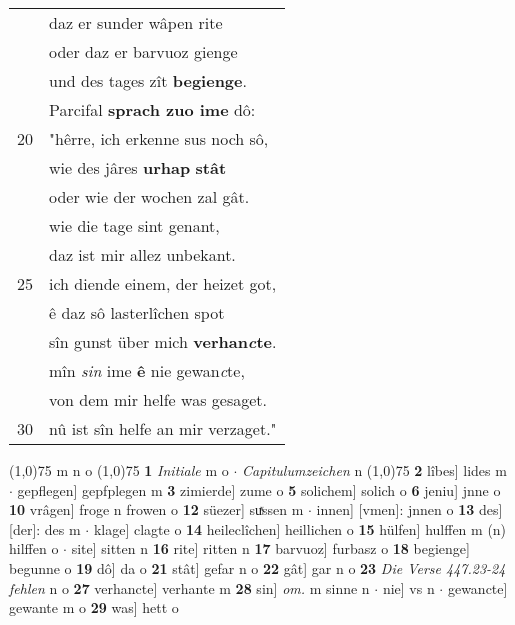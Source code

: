 \documentclass[8pt,a4paper,notitlepage]{article}
\begin{document}
\begin{table}[ht]
\begin{minipage}[t]{0.5\linewidth}
\begin{tabular}{rl}
 & daz er sunder wâpen rite\\ 
 & oder daz er barvuoz gienge\\ 
 & und des tages zît \textbf{begienge}.\\ 
 & Parcifal \textbf{sprach zuo ime} dô:\\ 
20 & "hêrre, ich erkenne sus noch sô,\\ 
 & wie des jâres \textbf{urhap} \textbf{stât}\\ 
 & oder wie der wochen zal gât.\\ 
 & wie die tage sint genant,\\ 
 & daz ist mir allez unbekant.\\ 
25 & ich diende einem, der heizet got,\\ 
 & ê daz sô lasterlîchen spot\\ 
 & sîn gunst über mich \textbf{verhan\textit{c}te}.\\ 
 & mîn \textit{sin} ime \textbf{ê} nie gewan\textit{c}te,\\ 
 & von dem mir helfe was gesaget.\\ 
30 & nû ist sîn helfe an mir verzaget."\\ 
\end{tabular}
\scriptsize
\line(1,0){75} \newline
m n o \newline
\line(1,0){75} \newline
\textbf{1} \textit{Initiale} m o   $\cdot$ \textit{Capitulumzeichen} n  \newline
\line(1,0){75} \newline
\textbf{2} lîbes] lides m  $\cdot$ gepflegen] gepfplegen m \textbf{3} zimierde] zume o \textbf{5} solichem] solich o \textbf{6} jeniu] jnne o \textbf{10} vrâgen] froge n frowen o \textbf{12} süezer] suͯssen m  $\cdot$ innen] [vmen]: jnnen o \textbf{13} des] [der]: des m  $\cdot$ klage] clagte o \textbf{14} heileclîchen] heillichen o \textbf{15} hülfen] hulffen m (n) hilffen o  $\cdot$ site] sitten n \textbf{16} rite] ritten n \textbf{17} barvuoz] furbasz o \textbf{18} begienge] begunne o \textbf{19} dô] da o \textbf{21} stât] gefar n o \textbf{22} gât] gar n o \textbf{23} \textit{Die Verse 447.23-24 fehlen} n o  \textbf{27} verhancte] verhante m \textbf{28} sin] \textit{om.} m sinne n  $\cdot$ nie] vs n  $\cdot$ gewancte] gewante m o \textbf{29} was] hett o \newline
\end{minipage}
\end{table}
\newpage
\end{document}
